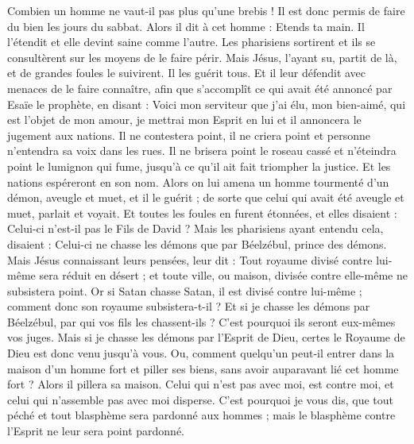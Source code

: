 \begin{multicols}{2}
Combien un homme ne vaut-il pas plus qu'une brebis ! Il est donc permis de faire du bien les jours du sabbat.
Alors il dit à cet homme : Etends ta main. Il l'étendit et elle devint saine comme l'autre.
Les pharisiens sortirent et ils se consultèrent sur les moyens de le faire périr.
Mais Jésus, l'ayant su, partit de là, et de grandes foules le suivirent. Il les guérit tous.
Et il leur défendit avec menaces de le faire connaître,
afin que s'accomplît ce qui avait été annoncé par Esaïe le prophète, en disant :
Voici mon serviteur que j'ai élu, mon bien-aimé, qui est l'objet de mon amour, je mettrai mon Esprit en lui et il annoncera le jugement aux nations.
Il ne contestera point, il ne criera point et personne n'entendra sa voix dans les rues.
Il ne brisera point le roseau cassé et n'éteindra point le lumignon qui fume, jusqu'à ce qu'il ait fait triompher la justice.
Et les nations espéreront en son nom.
Alors on lui amena un homme tourmenté d'un démon, aveugle et muet, et il le guérit ; de sorte que celui qui avait été aveugle et muet, parlait et voyait.
Et toutes les foules en furent étonnées, et elles disaient : Celui-ci n'est-il pas le Fils de David ?
Mais les pharisiens ayant entendu cela, disaient : Celui-ci ne chasse les démons que par Béelzébul, prince des démons.
Mais Jésus connaissant leurs pensées, leur dit : Tout royaume divisé contre lui-même sera réduit en désert ; et toute ville, ou maison, divisée contre elle-même ne subsistera point.
Or si Satan chasse Satan, il est divisé contre lui-même ; comment donc son royaume subsistera-t-il ?
Et si je chasse les démons par Béelzébul, par qui vos fils les chassent-ils ? C'est pourquoi ils seront eux-mêmes vos juges.
Mais si je chasse les démons par l'Esprit de Dieu, certes le Royaume de Dieu est donc venu jusqu'à vous.
Ou, comment quelqu'un peut-il entrer dans la maison d'un homme fort et piller ses biens, sans avoir auparavant lié cet homme fort ? Alors il pillera sa maison.
Celui qui n'est pas avec moi, est contre moi, et celui qui n'assemble pas avec moi disperse.
C'est pourquoi je vous dis, que tout péché et tout blasphème sera pardonné aux hommes ; mais le blasphème contre l'Esprit ne leur sera point pardonné.

\end{multicols}
